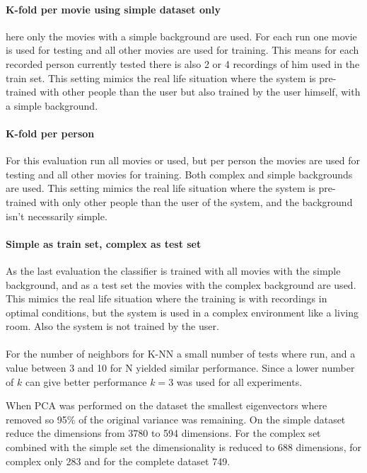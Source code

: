 \paragraph{K-fold per movie using simple dataset only}
here only the movies with a simple background are used. For each run one movie is used for testing and all other movies are used for training. This means for each recorded person currently tested there is also 2 or 4 recordings of him used in the train set. This setting mimics the real life situation where the system is pre-trained with other people than the user but also trained by the user himself, with a simple background.

\paragraph{K-fold per person}
For this evaluation run all movies or used, but per person the movies are used for testing and all other movies for training. Both complex and simple backgrounds are used. This setting mimics the real life situation where the system is pre-trained with only other people than the user of the system, and the background isn't necessarily simple. 

\paragraph{Simple as train set, complex as test set}
As the last evaluation the classifier is trained with all movies with the simple background, and as a test set the movies with the complex background are used. This mimics the real life situation where the training is with recordings in optimal conditions, but the system is used in a complex environment like a living room. Also the system is not trained by the user.

\paragraph{}
For the number of neighbors for K-NN a small number of tests where run, and a value between 3 and 10 for N yielded similar performance. Since a lower number of $k$ can give better performance $k=3$ was used for all experiments.

When PCA was performed on the dataset the smallest eigenvectors where removed so 95\% of the original variance was remaining. On the simple dataset reduce the dimensions from 3780 to 594 dimensions. For the complex set combined with the simple set the dimensionality is reduced to 688 dimensions, for complex only 283 and for the complete dataset 749.

